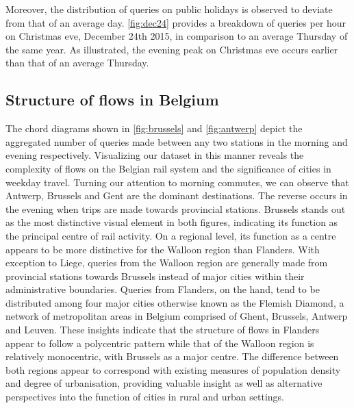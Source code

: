 \documentclass{sig-alternate}
\newcommand{\todo}[1]{\noindent\textcolor{red}{{\bf \{TODO}: #1{\bf \}}}}
\begin{document}
Moreover, the distribution of queries on public holidays is observed to deviate from that of an average day. 
\cref{fig:dec24} provides a breakdown of queries per hour on Christmas eve, December 24th 2015, in comparison to an average Thursday of the same year. 
As illustrated, the evening peak on Christmas eve occurs earlier than that of an average Thursday. 

\subsection{Structure of flows in Belgium}

The chord diagrams shown in \cref{fig:brussels} and \cref{fig:antwerp} depict the aggregated number of queries made between any two stations in the morning and evening respectively. 
Visualizing our dataset in this manner reveals the complexity of flows on the Belgian rail system and the significance of cities in weekday travel.
Turning our attention to morning commutes, we can observe that Antwerp, Brussels and Gent are the dominant destinations.
The reverse occurs in the evening when trips are made towards provincial stations.
Brussels stands out as the most distinctive visual element in both figures, indicating its function as the principal centre of rail activity.
On a regional level, its function as a centre appears to be more distinctive for the Walloon region than Flanders.
With exception to Liege, queries from the Walloon region are generally made from provincial stations towards Brussels instead of major cities within their administrative boundaries. 
Queries from Flanders, on the hand, tend to be distributed among four major cities otherwise known as the Flemish Diamond, a network of metropolitan areas in Belgium comprised of Ghent, Brussels, Antwerp and Leuven. 
These insights indicate that the structure of flows in Flanders appear to follow a polycentric pattern while that of the Walloon region is relatively monocentric, with   Brussels as a major centre.
The difference between both regions appear to correspond with existing measures of population density and degree of urbanisation, providing valuable insight as well as alternative perspectives into the function of cities in rural and urban settings.
\end{document}
